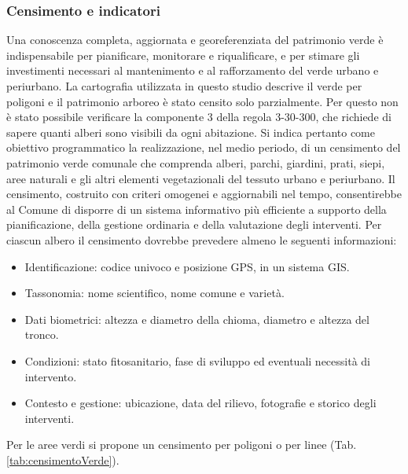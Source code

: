 \documentclass[
  a4paper,
]{book}
\providecommand{\tightlist}{%
  \setlength{\itemsep}{0pt}\setlength{\parskip}{0pt}}
\begin{document}
\subsubsection{Censimento e indicatori}\label{censimento-e-indicatori}

Una conoscenza completa, aggiornata e georeferenziata del patrimonio verde è indispensabile per pianificare, monitorare e riqualificare, e per stimare gli investimenti necessari al mantenimento e al rafforzamento del verde urbano e periurbano.
La cartografia utilizzata in questo studio descrive il verde per poligoni e il patrimonio arboreo è stato censito solo parzialmente.
Per questo non è stato possibile verificare la componente 3 della regola 3-30-300, che richiede di sapere quanti alberi sono visibili da ogni abitazione.
Si indica pertanto come obiettivo programmatico la realizzazione, nel medio periodo, di un censimento del patrimonio verde comunale che comprenda alberi, parchi, giardini, prati, siepi, aree naturali e gli altri elementi vegetazionali del tessuto urbano e periurbano.
Il censimento, costruito con criteri omogenei e aggiornabili nel tempo, consentirebbe al Comune di disporre di un sistema informativo più efficiente a supporto della pianificazione, della gestione ordinaria e della valutazione degli interventi.
Per ciascun albero il censimento dovrebbe prevedere almeno le seguenti informazioni:

\begin{itemize}
\tightlist
\item
  Identificazione: codice univoco e posizione GPS, in un sistema GIS.
\item
  Tassonomia: nome scientifico, nome comune e varietà.
\item
  Dati biometrici: altezza e diametro della chioma, diametro e altezza del tronco.
\item
  Condizioni: stato fitosanitario, fase di sviluppo ed eventuali necessità di intervento.
\item
  Contesto e gestione: ubicazione, data del rilievo, fotografie e storico degli interventi.
\end{itemize}

Per le aree verdi si propone un censimento per poligoni o per linee (Tab. \ref{tab:censimentoVerde}).
\end{document}
